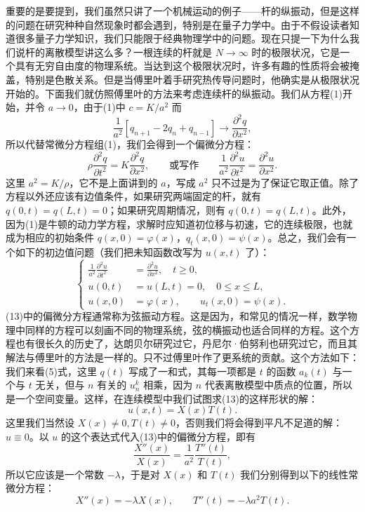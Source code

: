 重要的是要提到，我们虽然只讲了一个机械运动的例子——杆的纵振动，但是这样的问题在研究种种自然现象时都会遇到，特别是在量子力学中。由于不假设读者知道很多量子力学知识，我们只能限于经典物理学中的问题。现在只提一下为什么我们说杆的离散模型讲这么多？一根连续的杆就是 $N\to\infty$ 时的极限状况，它是一个具有无穷自由度的物理系统。当达到这个极限状况时，许多有趣的性质将会被掩盖，特别是色散关系。但是当傅里叶着手研究热传导问题时，他确实是从极限状况开始的。下面我们就仿照傅里叶的方法来考虑连续杆的纵振动。我们从方程(1)开始，并令 $a\to0$，由于(1)中 $c=K/a^2$ 而
\[
 \frac1{a^2}[q_{n+1}-2q_n+q_{n-1}]\to\frac{\partial^2q}{\partial x^2},
\]
所以代替常微分方程组(1)，我们会得到一个偏微分方程：
\[
 \rho\frac{\partial^2q}{\partial t^2}=K\frac{\partial^2q}{\partial x^2},
 \qquad\text{或写作}\qquad
 \frac1{a^2}\frac{\partial^2u}{\partial t^2}=\frac{\partial^2u}{\partial x^2}.
\]
这里 $a^2=K/\rho$，它不是上面讲到的 $a$，写成 $a^2$ 只不过是为了保证它取正值。除了方程以外还应该有边值条件，如果研究两端固定的杆，就有 $q(0,t)=q(L,t)=0$；如果研究周期情况，则有 $q(0,t)=q(L,t)$。此外，因为(1)是牛顿的动力学方程，求解时应知道初位移与初速，它的连续极限，也就成为相应的初始条件 $q(x,0)=\varphi(x)$，$q_t(x,0)=\psi(x)$。总之，我们会有一个如下的初边值问题（我们把未知函数改写为 $u(x,t)$ 了）：
\begin{equation}
 \left\{
 \begin{aligned}
 \frac1{a^2}\frac{\partial^2u}{\partial t^2}&=\frac{\partial^2u}{\partial x^2},\quad t\ge0,\\
 u(0,t)&=u(L,t)=0,\quad 0\le x\le L,\\
 u(x,0)&=\varphi(x),\qquad u_t(x,0)=\psi(x).
 \end{aligned}
 \right.
 \tag{13}
\end{equation}
(13)中的偏微分方程通常称为弦振动方程。这是因为，和常见的情况一样，数学物理中同样的方程可以刻画不同的物理系统，弦的横振动也适合同样的方程。这个方程也有很长久的历史了，达朗贝尔研究过它，丹尼尔·伯努利也研究过它，而且其解法与傅里叶的方法是一样的。只不过傅里叶作了更系统的贡献。这个方法如下：我们来看(5)式，这里 $q(t)$ 写成了一和式，其每一项都是 $t$ 的函数 $a_k(t)$ 与一个与 $t$ 无关，但与 $n$ 有关的 $u_n^k$ 相乘，因为 $n$ 代表离散模型中质点的位置，所以是一个空间变量。这样，在连续模型中我们试图求(13)的这样形状的解：
\[
 u(x,t)=X(x)T(t).
\]
这里我们当然设 $X(x)\ne0,T(t)\ne0$，否则我们将会得到平凡不足道的解：$u\equiv0$。以 $u$ 的这个表达式代入(13)中的偏微分方程，即有
\[
 \frac{X''(x)}{X(x)}=\frac1{a^2}\frac{T''(t)}{T(t)},
\]
所以它应该是一个常数 $-\lambda$，于是对 $X(x)$ 和 $T(t)$ 我们分别得到以下的线性常微分方程：
\[
 X''(x)=-\lambda X(x),\qquad T''(t)=-\lambda a^2T(t).
\]
